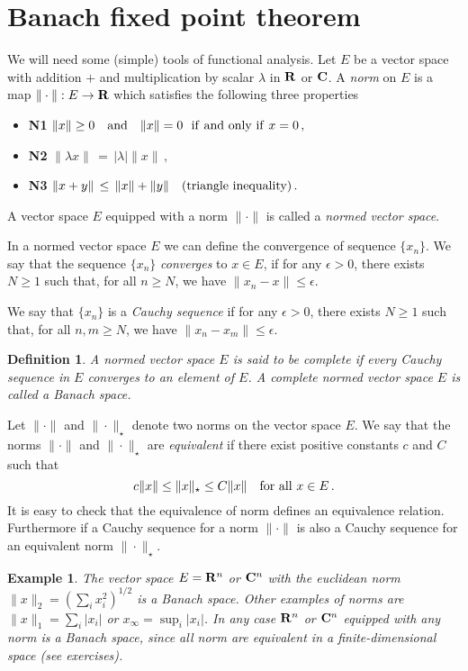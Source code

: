 \documentclass[12pt]{report}
\newcommand{\bC}{{\bf C}}
\newcommand{\bR}{{\bf R}}
\newtheorem{example}[theorem]{Example}
\newtheorem{definition}[theorem]{Definition}
\def\to{\rightarrow}
\begin{document}
\section{Banach fixed point theorem}  We will need some (simple) tools of 
functional analysis.  Let $E$ be a vector space with addition $+$ and
multiplication by scalar $\lambda$ in $ \bR$ or $\bC$.  A {\em norm} on $E$
is a map $\| \cdot \| : E \to \bR$ which satisfies the following three
properties
\begin{itemize}
\item{\bf N1} $\|x\| \ge 0 \quad {\rm and} \quad \|x\|=0 \,\, 
{\rm ~if~and~only~if~} x=0\,,$
\item{\bf N2} $\|\lambda x \| \,=\, |\lambda| \|x\| \,,$
\item{\bf N3}  $\| x + y \| \,\le\, \|x\| + \|y\|  \quad 
{\rm (triangle~inequality)} \,.$
\end{itemize}  
A vector space $E$ equipped with a norm $\| \cdot \|$ is called a {\em normed vector space}. 

In a normed vector space $E$ we can define the convergence of sequence $\{ x_n\}$.  
We say that the sequence $\{x_n\}$ {\em converges} to $x \in E$, if for
any $\epsilon >0$, there exists $N \ge 1$ such that, for all $n \ge N$,
we have $\|x_n - x\| \le \epsilon$.

We say that $\{x_n\}$ is a {\em Cauchy sequence} if for any $\epsilon
>0$, there exists $N \ge 1$ such that, for all $n, m \ge N$, we have
$\|x_n - x_m\| \le \epsilon$.


\begin{definition}{\rm  A normed vector space $E$ is said to be {\em complete} if every Cauchy
sequence in $E$ converges to an element of $E$. A complete normed
vector space $E$ is called a {\em Banach space}.  }
\end{definition}




Let $\| \cdot \|$ and $\| \cdot \|_{\star}$ denote two norms on the vector space $E$.  We say 
that the norms $\| \cdot \|$ and $\| \cdot \|_{\star}$ are {\em equivalent} if there exist positive 
constants $c$ and $C$ such that 
$$
c \| x \| \leq  \| x \|_{\star} \leq C \|x\| \quad {\rm for~all~}x \in E \,.
$$
It is easy to check that the equivalence of norm defines an equivalence relation.  Furthermore 
if a Cauchy sequence for a norm $\| \cdot\|$ is also a Cauchy sequence for an equivalent norm 
$\| \cdot \|_{\star}$. 


\begin{example}{\rm 
The vector space $E=\bR^n$ or $\bC^n$ with the euclidean norm 
$\|x\|_2 = (\sum_i x_i^2)^{1/2}$ is a Banach space.  Other examples of norms are 
$\|x\|_1 = \sum_i |x_i|$ or $x_\infty = \sup_i |x_i|$.   In any case $\bR^n$ or $\bC^n$ equipped with any norm 
is a Banach space, since all norm are equivalent in a finite-dimensional space (see exercises). 
}
\end{example}
\end{document}
